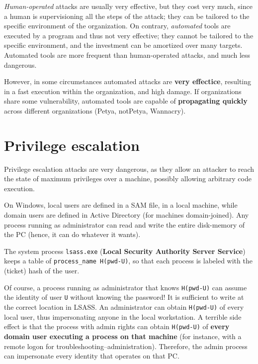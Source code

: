 \documentclass[10pt]{extbook}
\begin{document}
\emph{Human\--operated} attacks are usually very effective, but they cost very
much, since a human is supervisioning all the steps of the attack; they can be
tailored to the specific environment of the organization. On contrary,
\emph{automated} tools are executed by a program and thus not very effective;
they cannot be tailored to the specific environment, and the investment can be
amortized over many targets. Automated tools are more frequent than
human\--operated attacks, and much less dangerous.

However, in some circumstances automated attacks are \textbf{very effectice},
resulting in a fast execution within the organization, and high damage. If
organizations share some vulnerability, automated tools are capable of
\textbf{propagating quickly} across different organizations (Petya, notPetya,
Wannacry).

\section{Privilege escalation}

Privilege escalation attacks are very dangerous, as they allow an attacker to
reach the state of maximum privileges over a machine, possibly allowing
arbitrary code execution.

On Windows, local users are defined in a SAM file, in a local machine, while
domain users are defined in Active Directory (for machines domain\--joined).
Any process running as administrator can read and write the entire
disk\--memory of the PC (hence, it can do whatever it wants).

The system process \texttt{lsass.exe} (\textbf{Local Security Authority Server
Service}) keeps a table of \texttt{process\_name H(pwd-U)}, so that each
process is labeled with the (ticket) hash of the user.

Of course, a process running as administrator that knows \texttt{H(pwd-U)} can
assume the identity of user \texttt{U} without knowing the password! It is
sufficient to write at the correct location in LSASS. An administrator can
obtain \texttt{H(pwd-U)} of every local user, thus impersonating anyone in the
local workstation. A terrible side effect is that the process with admin rights
can obtain \texttt{H(pwd-U)} of \textbf{every domain user executing a process
on that machine} (for instance, with a remote logon for
troubleshooting\---administration). Therefore, the admin process can
impersonate every identity that operates on that PC.
\end{document}
